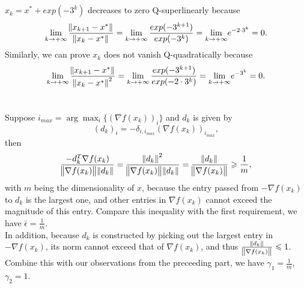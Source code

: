 \documentclass[11pt]{article}
\begin{document}
\maketitle
\section{}
$x_k=x^*+exp(-3^k)$ decreases to zero Q-superlinearly because $$\lim_{k\to+\infty}\frac{\norm{x_{k+1}-x^*}}{\norm{x_{k}-x^*}}=\lim_{k\to+\infty}\frac{exp(-3^{k+1})}{exp(-3^{k})}={\lim_{k\to+\infty}}e^{-2\cdot 3^k}=0.$$ Similarly, we can prove ${x_k}$ does not vanish Q-quadratically because $$\lim_{k\to+\infty}\frac{\norm{x_{k+1}-x^*}}{\norm{x_{k}-x^*}^2}=\lim_{k\to+\infty}\frac{exp(-3^{k+1})}{exp(-2\cdot3^{k})}={\lim_{k\to+\infty}}e^{-3^k}=0.$$

\section{}
Suppose $i_{max}=\arg\max_{i}\{(\nabla f(x_k))_i\}$ and $d_k$ is given by $$(d_k)_i=-\delta_{i,i_{max}}(\nabla f(x_k))_{i_{max}},$$ then $$\frac{-d_k^T\nabla f(x_k)}{\norm{\nabla f(x_k)}\norm{d_k}}=\frac{\norm{d_k}^2}{\norm{\nabla f(x_k)}\norm{d_k}}=\frac{\norm{d_k}}{\norm{\nabla f(x_k)}}\geqslant\frac1m, $$ with $m$ being the dimensionality of $x$, because the entry passed from $-\nabla f(x_k)$ to $d_k$ is the largest one, and other entries in $\nabla f(x_k)$ cannot exceed the magnitude of this entry. Compare this inequality with the first requirement, we have $\bar{\epsilon}=\frac1m$.\\[0.5cm]
In addition, because $d_k$ is constructed by picking out the largest entry in $-\nabla f(x_k)$, its norm cannot exceed that of $\nabla f(x_k)$, and thus $\frac{\norm{d_k}}{\norm{\nabla f(x_k)}}\leqslant1$. Combine this with our observations from the preceeding part, we have $\gamma_1=\frac1m$, $\gamma_2=1$.
\end{document}
